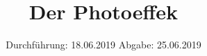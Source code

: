 

\subject{V500}
\title{Der Photoeffek}
\date{%
  Durchführung: 18.06.2019
  \hspace{3em}
  Abgabe: 25.06.2019
}



\maketitle
\thispagestyle{empty}
\tableofcontents
\newpage






\printbibliography{}


